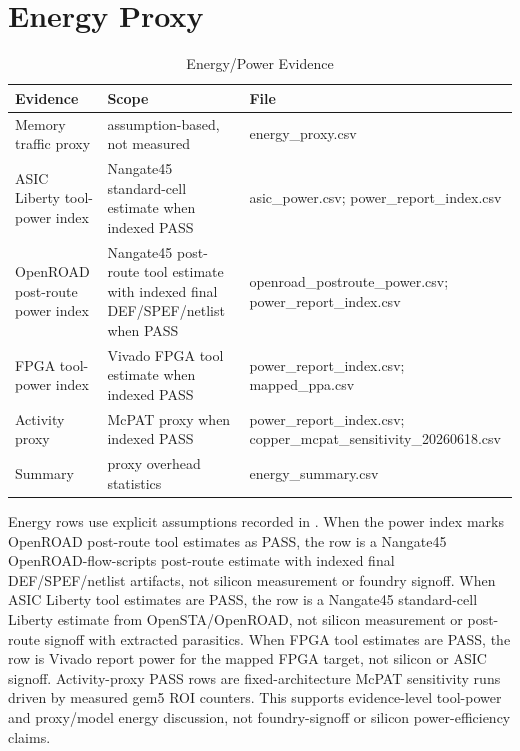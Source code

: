 \documentclass[10pt]{article}
\begin{document}
\section{Energy Proxy}
\begin{table}[H]
\centering
\caption{Energy/Power Evidence}
\begin{tabularx}{\linewidth}{YYY}
\hline
Evidence & Scope & File \\
\hline
Memory traffic proxy & assumption-based, not measured & energy\_proxy.csv \\
ASIC Liberty tool-power index & Nangate45 standard-cell estimate when indexed PASS & asic\_power.csv; power\_report\_index.csv \\
OpenROAD post-route power index & Nangate45 post-route tool estimate with indexed final DEF/SPEF/netlist when PASS & openroad\_postroute\_power.csv; power\_report\_index.csv \\
FPGA tool-power index & Vivado FPGA tool estimate when indexed PASS & power\_report\_index.csv; mapped\_ppa.csv \\
Activity proxy & McPAT proxy when indexed PASS & power\_report\_index.csv; copper\_mcpat\_sensitivity\_20260618.csv \\
Summary & proxy overhead statistics & energy\_summary.csv \\
\hline
\end{tabularx}
\end{table}

Energy rows use explicit assumptions recorded in . When the power index marks OpenROAD post-route tool estimates as PASS, the row is a Nangate45 OpenROAD-flow-scripts post-route estimate with indexed final DEF/SPEF/netlist artifacts, not silicon measurement or foundry signoff. When ASIC Liberty tool estimates are PASS, the row is a Nangate45 standard-cell Liberty estimate from OpenSTA/OpenROAD, not silicon measurement or post-route signoff with extracted parasitics. When FPGA tool estimates are PASS, the row is Vivado report power for the mapped FPGA target, not silicon or ASIC signoff. Activity-proxy PASS rows are fixed-architecture McPAT sensitivity runs driven by measured gem5 ROI counters. This supports evidence-level tool-power and proxy/model energy discussion, not foundry-signoff or silicon power-efficiency claims.
\end{document}
